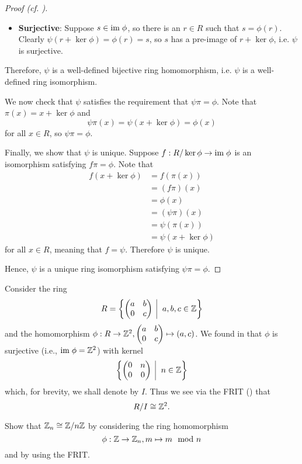 \begin{proof}[Proof (cf. {\cite[p.~302, Factor Theorem For Rings]{cohn_1982}})]
\begin{itemize}
        \item \textbf{Surjective}: Suppose $s \in \mathrm{im}\;\phi$, so there is an $r \in R$ such that $s = \phi(r)$. Clearly $\psi(r + \ker\phi) = \phi(r) = s$, so $s$ has a pre-image of $r + \ker\phi$, i.e. $\psi$ is surjective.
    \end{itemize}
    Therefore, $\psi$ is a well-defined bijective ring homomorphism, i.e. $\psi$ is a well-defined ring isomorphism.

    We now check that $\psi$ satisfies the requirement that $\psi\pi = \phi$. Note that $\pi(x) = x + \ker\phi$ and
    \[
        \psi\pi(x) = \psi(x + \ker\phi) = \phi(x)
    \]
    for all $x \in R$, so $\psi\pi = \phi$.

    Finally, we show that $\psi$ is unique. Suppose $f: R/\ker\phi \to \mathrm{im}\;\phi$ is an isomorphism satisfying $f\pi=\phi$. Note that
    \begin{align*}
        f(x + \ker\phi) &= f(\pi(x))\\
        &= (f\pi)(x)\\
        &= \phi(x)\\
        &= (\psi\pi)(x)\\
        &= \psi(\pi(x))\\
        &= \psi(x + \ker\phi)
    \end{align*}
    for all $x \in R$, meaning that $f = \psi$. Therefore $\psi$ is unique.

    Hence, $\psi$ is a unique ring isomorphism satisfying $\psi\pi = \phi$.
\end{proof}

\begin{example}
    Consider the ring
    \[
        R = \left\{\begin{pmatrix}a&b\\0&c\end{pmatrix}\vert a,b,c\in\Z\right\}
    \]
    and the homomorphism $\phi: R \to \mathbb{Z}^2, \begin{pmatrix}a&b\\0&c\end{pmatrix} \mapsto (a,c)$. We found in  that $\phi$ is surjective (i.e., $\mathrm{im}\;\phi = \mathbb{Z}^2$) with kernel
    \[
        \left\{\begin{pmatrix}0&n\\0&0\end{pmatrix} \vert n \in \Z\right\}
    \]
    which, for brevity, we shall denote by $I$. Thus we see via the FRIT () that
    \[
        R/I \cong \mathbb{Z}^2.
    \]
\end{example}
\begin{exercise}
    Show that $\mathbb{Z}_n \cong \mathbb{Z}/n\mathbb{Z}$ by considering the ring homomorphism
    \[
        \phi: \mathbb{Z} \to \mathbb{Z}_n, m \mapsto m \mod n
    \]
    and by using the FRIT.
\end{exercise}


